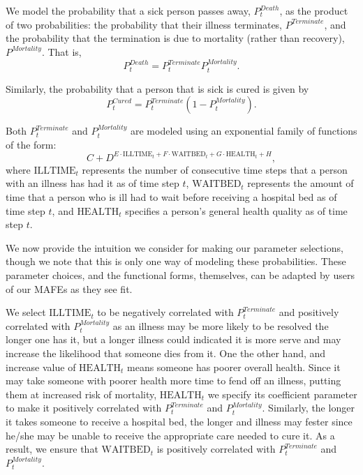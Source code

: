 We model the probability that a sick person passes away, $P^{Death}_t$, as the product of two probabilities: the probability that their illness terminates, $P^{Terminate}$, and the probability that the termination is due to mortality (rather than recovery), $P^{Mortality}$. That is,
\begin{equation}
    P^{Death}_t = P^{Terminate}_t P^{Mortality}_t.
\end{equation}

Similarly, the probability that a person that is sick is cured is given by
\begin{equation}
    P^{Cured}_t = P^{Terminate}_t(1-P^{Mortality}_t).
\end{equation}

Both $P^{Terminate}_t$ and $P^{Mortality}_t$ are modeled using an exponential family of functions of the form:
\begin{equation}
    C + D^{E\cdot\text{ILLTIME}_t+F \cdot\text{WAITBED}_t + G \cdot\text{HEALTH}_t +H},
\end{equation}
where $\text{ILLTIME}_t$ represents the number of consecutive time steps that a person with an illness has had it as of time step $t$, $\text{WAITBED}_t$ represents the amount of time that a person who is ill had to wait before receiving a hospital bed as of time step $t$, and $\text{HEALTH}_t$ specifies a person's general health quality as of time step $t$.
    
We now provide the intuition we consider for making our parameter selections, though we note that this is only one way of modeling these probabilities. These parameter choices, and the functional forms, themselves, can be adapted by users of our MAFEs as they see fit. 

We select $\text{ILLTIME}_t$ to be negatively correlated with $P^{Terminate}_t$ and positively correlated with $P^{Mortality}_t$ as an illness may be more likely to be resolved the longer one has it, but a longer illness could indicated it is more serve and may increase the likelihood that someone dies from it. One the other hand, and increase value of $\text{HEALTH}_t$ means someone has poorer overall health. Since it may take someone with poorer health more time to fend off an illness, putting them at increased risk of mortality, $\text{HEALTH}_t$ we specify its coefficient parameter to make it positively correlated with $P^{Terminate}_t$ and $P^{Mortality}_t$. Similarly, the longer it takes someone to receive a hospital bed, the longer and illness may fester since he/she may be unable to receive the appropriate care needed to cure it. As a result, we ensure that $\text{WAITBED}_t$ is positively correlated with $P^{Terminate}_t$ and $P^{Mortality}_t$.
  

